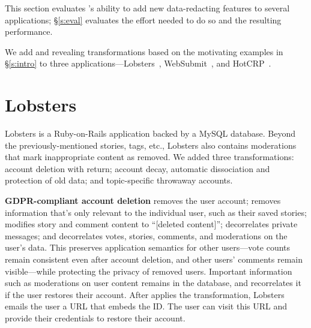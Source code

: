 This section evaluates \sys's ability to add new data-redacting features to
several applications; \S\ref{s:eval} evaluates the effort needed to do so and the
resulting performance.
%

%
We add \xxing and revealing transformations based on
the motivating examples in \S\ref{s:intro}
to three applications---Lobsters~\cite{lobsters},
WebSubmit~\cite{websubmit-rs},
and HotCRP~\cite{hotcrp}.
%
%
%


\section{Lobsters}
\label{s:cs:lobsters}

%
Lobsters is a Ruby-on-Rails application backed by a MySQL database.
%
Beyond the previously-mentioned stories, tags, etc., Lobsters also contains
moderations that mark inappropriate content as removed.
%
We added three \xxing transformations: account deletion with return; account
decay, \ie automatic dissociation and protection of old data; and topic-specific
throwaway accounts.
%

%
\textbf{GDPR-compliant account deletion}
\one{} removes the user account;
\two{} removes information that's only relevant to the individual user, such as
their saved stories;
\three{} modifies story and comment content to ``[deleted content]'';
\four{} decorrelates private messages; and
\five{} decorrelates votes, stories, comments, and moderations on the user's
data. %
%
%
This preserves application semantics for other users---\eg vote counts remain
consistent even after account deletion, and other users' comments
remain visible---while protecting the privacy of removed users.
%
Important information such as moderations on user content remains in the
database, and \sys recorrelates it if the user restores their account.
%
After \sys applies the \xxing transformation, Lobsters emails the user a URL
that embeds the \xx ID.
%
The user can visit this URL and provide their credentials to restore their account.
%
%

